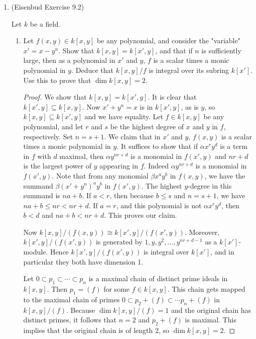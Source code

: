 \documentclass[Letter,12pt]{article}
\newcommand{\<}{\left\langle}
\renewcommand{\>}{\right\rangle}
\theoremstyle{definition}
\begin{document}
	
	\begin{enumerate}
		\item (Eisenbud Exercise 9.2)
		
		Let $k$ be a field.
		\begin{enumerate}
			\item Let $f(x,y)\in k[x,y]$ be any polynomial, and consider the "variable" $x'=x-y^n$.  Show that $k[x,y]=k[x',y]$, and that if $n$ is sufficiently large, then as a polynomial in $x'$ and $y$, $f$ is a scalar times a monic polynomial in $y$.  Deduce that $k[x,y]/f$ is integral over its subring $k[x']$.  Use this to prove that $\dim k[x,y]=2$.
			\begin{proof}
				We show that $k[x,y]=k[x',y]$.  It is clear that $k[x',y]\subseteq k[x,y]$.  Now $x'+y^n=x$ is in $k[x',y]$, as is $y$, so $k[x,y]\subseteq k[x',y]$ and we have equality.
				Let $f\in k[x,y]$ be any polynomial, and let $r$ and $s$ be the highest degree of $x$ and $y$ in $f$, respectively. Set $n=s+1$.  We claim that in $x'$ and $y$, $f(x,y)$ is a scalar times a monic polynomial in $y$.  It suffices to show that if $\alpha x^ry^d$ is a term in $f$ with $d$ maximal, then $\alpha y^{nr+d}$ is a monomial in $f(x',y)$ and $nr+d$ is the largest power of $y$ appearing in $f$.  Indeed $\alpha y^{nr+d}$ is a monomial in $f(x',y)$.  Note that from any monomial $\beta x^ay^b$ in $f(x,y)$, we have the summand $\beta (x'+y^n)^ay^b$ in $f(x',y)$.  The highest $y$-degree in this summand is $na+b$.  If $a<r$, then because $b\leq s$ and $n=s+1$, we have $na+b\leq nr<nr+d$.  If $a=r$, and this polynomial is not $\alpha x^ry^d$, then $b<d$ and $na+b<nr+d$.  This proves our claim.
				
				Now $k[x,y]/(f(x,y))\cong k[x',y]/(f(x',y))$.  Moreover, $k[x',y]/(f(x',y))$ is generated by $1, y, y^2, \ldots, y^{nr+d-1}$ as a $k[x']$-module.  Hence $k[x',y]/(f(x',y))$ is integral over $k[x']$, and in particular they both have dimension 1.
				
				Let $0\subset p_1\subset\cdots\subset p_n$ is a maximal chain of distinct prime ideals in $k[x,y]$.  Then $p_1=(f)$ for some $f\in k[x,y]$.  This chain gets mapped to the maximal chain of primes $0\subset p_2+(f)\subset \cdots p_n+(f)$ in $k[x,y]/(f)$.  Because $\dim k[x,y]/(f)=1$ and the original chain has distinct primes, it follows that $n=2$ and $p_2+(f)$ is maximal.  This implies that the original chain is of length $2$, so $\dim k[x,y]=2$.
			\end{proof}
			

\end{enumerate}
\end{enumerate}
\end{document}
